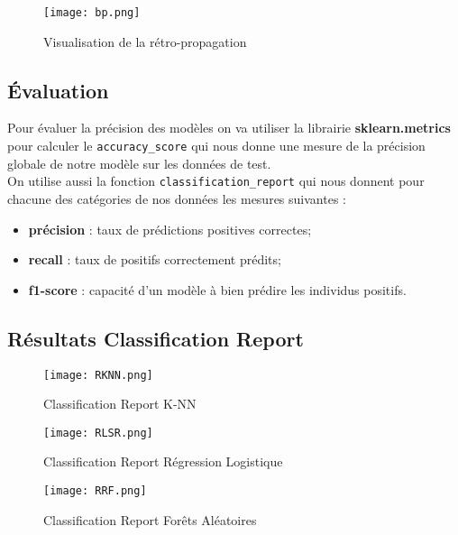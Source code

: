 \documentclass[a4paper,french,12pt]{article}
\begin{document}
\begin{figure}[!h]
    \centering
    \texttt{[image: bp.png]}
    \caption{Visualisation de la rétro-propagation}
\end{figure}

\subsection{Évaluation}

Pour évaluer la précision des modèles on va utiliser la librairie \textbf{sklearn.metrics} pour calculer le \verb|accuracy_score| qui nous donne une mesure de la précision globale de notre modèle sur les données de test.\\

On utilise aussi la fonction \verb|classification_report| qui nous donnent pour chacune des catégories de nos données les mesures suivantes :\\

\begin{itemize}
    \item \textbf{précision} : taux de prédictions positives correctes;\\
    \item \textbf{recall} : taux de positifs correctement prédits;\\
    \item \textbf{f1-score} : capacité d'un modèle à bien prédire les individus positifs.
\end{itemize}

\newpage

\subsection{Résultats Classification Report}

\begin{figure}[!h]
    \centering
    \texttt{[image: RKNN.png]}
    \caption{Classification Report K-NN}
\end{figure}

\begin{figure}[!h]
    \centering
    \texttt{[image: RLSR.png]}
    \caption{Classification Report Régression Logistique}
\end{figure}

\begin{figure}[!h]
    \centering
    \texttt{[image: RRF.png]}
    \caption{Classification Report Forêts Aléatoires}
\end{figure}
\end{document}
